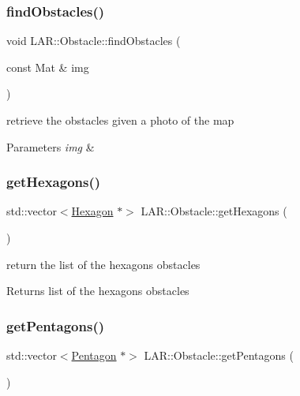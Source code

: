 \subsubsection{\texorpdfstring{find\+Obstacles()}{findObstacles()}}
{\footnotesize\ttfamily void L\+A\+R\+::\+Obstacle\+::find\+Obstacles (\begin{DoxyParamCaption}\item[{const Mat \&}]{img }\end{DoxyParamCaption})}

retrieve the obstacles given a photo of the map 
\begin{DoxyParams}{Parameters}
{\em img} & \\
\hline
\end{DoxyParams}
\mbox{\label{class_l_a_r_1_1_obstacle_af099a0d58043207698ab8953b7bb6885}} 
\subsubsection{\texorpdfstring{get\+Hexagons()}{getHexagons()}}
{\footnotesize\ttfamily std\+::vector$<$\mbox{\hyperlink{class_geometry2_d_1_1_hexagon}{Hexagon}} $\ast$$>$ L\+A\+R\+::\+Obstacle\+::get\+Hexagons (\begin{DoxyParamCaption}{ }\end{DoxyParamCaption})}

return the list of the hexagons obstacles \begin{DoxyReturn}{Returns}
list of the hexagons obstacles 
\end{DoxyReturn}
\mbox{\label{class_l_a_r_1_1_obstacle_af05966394f29bfa13777369db076d60a}} 
\subsubsection{\texorpdfstring{get\+Pentagons()}{getPentagons()}}
{\footnotesize\ttfamily std\+::vector$<$\mbox{\hyperlink{class_geometry2_d_1_1_pentagon}{Pentagon}} $\ast$$>$ L\+A\+R\+::\+Obstacle\+::get\+Pentagons (\begin{DoxyParamCaption}{ }\end{DoxyParamCaption})}

